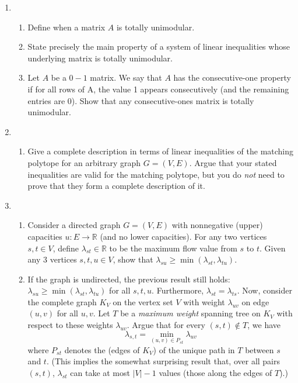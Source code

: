 \documentclass[12pt]{article}
\begin{document}
\begin{enumerate}
\item
\begin{enumerate}
\item
Define when a matrix $A$ is totally unimodular. 

\item
State precisely the main property of a system of linear inequalities whose underlying matrix is totally unimodular.

\item
Let $A$ be a $0-1$ matrix. We say that $A$ has the consecutive-one property if for all rows of A, the value 1 appears consecutively (and the remaining entries are 0). Show that any consecutive-ones matrix is totally unimodular. 
\end{enumerate}
\item
\begin{enumerate}
	\item
Give a complete description in terms of linear inequalities of the matching polytope for an arbitrary graph $G=(V,E)$. Argue that your stated inequalities are valid for the matching polytope, but you do {\it not} need to prove that they form a complete description of it. 
\end{enumerate}


\item
\begin{enumerate}
	\item
Consider a directed graph $G=(V,E)$ with nonnegative (upper) capacities $u: E \rightarrow {\mathbb R}$ (and no lower capacities). For any two vertices $s, t\in V$, define $\lambda_{st}\in {\mathbb R}$ to be the maximum flow value from $s$ to $t$. Given any 3 vertices $s, t, u\in V$, show that $\lambda_{su} \geq \min(\lambda_{st},\lambda_{tu})$. 

\item If the graph is undirected, the previous result still holds: $\lambda_{su} \geq \min(\lambda_{st},\lambda_{tu})$ for all $s, t, u$. Furthermore, $\lambda_{st}=\lambda_{ts}$. Now, consider the complete graph $K_V$ on the vertex set $V$ with weight $\lambda_{uv}$ on edge $(u,v)$ for all $u,v$. Let $T$ be a {\it maximum weight} spanning tree on $K_V$ with respect to these weights $\lambda_{uv}$. Argue that for every $(s,t)\notin T$, we have $$\lambda_{s,t}=\min_{(u,v)\in P_{st}} \lambda_{uv}$$ where $P_{st}$ denotes the (edges of $K_V$) of the unique path in $T$ between $s$ and $t$. (This implies the somewhat surprising result that, over all pairs $(s,t)$, $\lambda_{st}$ can take at most $|V|-1$ values (those along the edges of $T$).)
\end{enumerate}




\end{enumerate}
\end{document}
